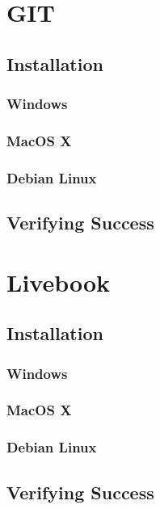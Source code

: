 \section{GIT}

\subsection{Installation}
\subsubsection{Windows}
\subsubsection{MacOS X}
\subsubsection{Debian Linux}
\subsection{Verifying Success}

\section{Livebook}

\subsection{Installation}
\subsubsection{Windows}
\subsubsection{MacOS X}
\subsubsection{Debian Linux}
\subsection{Verifying Success}

